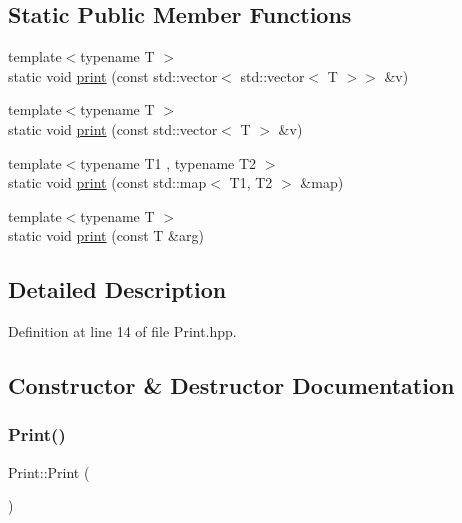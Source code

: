 \subsection*{Static Public Member Functions}
\begin{DoxyCompactItemize}
\item 
{\footnotesize template$<$typename T $>$ }\\static void \mbox{\hyperlink{class_print_ac634af53bf8c46bf58a8e538d883507d}{print}} (const std\+::vector$<$ std\+::vector$<$ T $>$$>$ \&v)
\item 
{\footnotesize template$<$typename T $>$ }\\static void \mbox{\hyperlink{class_print_a25829c4ccba037ef74becfa62d6df8e6}{print}} (const std\+::vector$<$ T $>$ \&v)
\item 
{\footnotesize template$<$typename T1 , typename T2 $>$ }\\static void \mbox{\hyperlink{class_print_a05c6cdd69d5464717dd309970a137dc9}{print}} (const std\+::map$<$ T1, T2 $>$ \&map)
\item 
{\footnotesize template$<$typename T $>$ }\\static void \mbox{\hyperlink{class_print_ad4e13f34dafb98c6c3591a45c620181a}{print}} (const T \&arg)
\end{DoxyCompactItemize}


\subsection{Detailed Description}


Definition at line 14 of file Print.\+hpp.



\subsection{Constructor \& Destructor Documentation}
\mbox{\label{class_print_a84154f9ef258a6e0d061c049d2cd430f}} 
\subsubsection{\texorpdfstring{Print()}{Print()}}
{\footnotesize\ttfamily Print\+::\+Print (\begin{DoxyParamCaption}{ }\end{DoxyParamCaption})\hspace{0.3cm}{\ttfamily [default]}}

